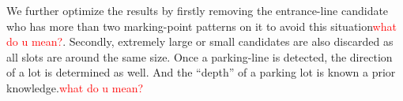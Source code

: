 \documentclass[journal]{IEEEtran}
\newcommand{\COMMENT}[1]{\textcolor{red}{#1}}
\begin{document}
%
%
We further optimize the results by firstly removing the entrance-line candidate who has more than two marking-point patterns on it to avoid this situation\COMMENT{what do u mean?}.  
Secondly, extremely large or small candidates are also discarded as all slots are around the same size.
Once a parking-line is detected, the direction of a lot is determined as well. 
And the “depth” of a parking lot is known a prior knowledge.\COMMENT{what do u mean?} 
\end{document}
